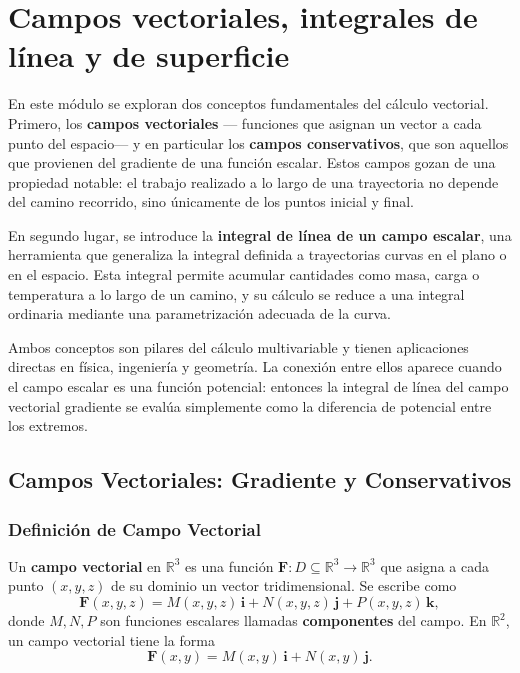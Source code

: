 \chapter{Campos vectoriales, integrales de línea y de superficie}


En este módulo se exploran dos conceptos fundamentales del cálculo
vectorial. Primero, los \textbf{campos vectoriales} — funciones que
asignan un vector a cada punto del espacio— y en particular los
\textbf{campos conservativos}, que son aquellos que provienen del
gradiente de una función escalar. Estos campos gozan de una propiedad
notable: el trabajo realizado a lo largo de una trayectoria no depende
del camino recorrido, sino únicamente de los puntos inicial y final.

En segundo lugar, se introduce la \textbf{integral de línea de un campo
escalar}, una herramienta que generaliza la integral definida a
trayectorias curvas en el plano o en el espacio. Esta integral permite
acumular cantidades como masa, carga o temperatura a lo largo de un
camino, y su cálculo se reduce a una integral ordinaria mediante una
parametrización adecuada de la curva.

Ambos conceptos son pilares del cálculo multivariable y tienen
aplicaciones directas en física, ingeniería y geometría. La conexión
entre ellos aparece cuando el campo escalar es una función potencial:
entonces la integral de línea del campo vectorial gradiente se evalúa
simplemente como la diferencia de potencial entre los extremos.

\section{Campos Vectoriales: Gradiente y Conservativos}

\subsection*{Definición de Campo Vectorial}

Un \textbf{campo vectorial} en \(\mathbb{R}^3\) es una función
\(\mathbf{F}: D \subseteq \mathbb{R}^3 \to \mathbb{R}^3\) que asigna a
cada punto \((x,y,z)\) de su dominio un vector tridimensional. Se
escribe como
\[
\mathbf{F}(x,y,z) = M(x,y,z)\,\mathbf{i} + N(x,y,z)\,\mathbf{j}
+ P(x,y,z)\,\mathbf{k},
\]
donde \(M,N,P\) son funciones escalares llamadas \textbf{componentes}
del campo. En \(\mathbb{R}^2\), un campo vectorial tiene la forma
\[
\mathbf{F}(x,y) = M(x,y)\,\mathbf{i} + N(x,y)\,\mathbf{j}.
\]

